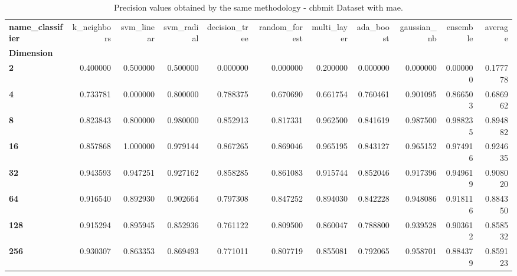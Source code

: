 \begin{table}
\centering
\caption{Precision values obtained by the same methodology - chbmit Dataset with mae.}
\label{precision_chbmit_mae-reproduction}
\begin{tabular}{lrrrrrrrrrr}
\toprule
\textbf{name\_classifier} &  k\_neighbors &  svm\_linear &  svm\_radial &  decision\_tree &  random\_forest &  multi\_layer &  ada\_boost &  gaussian\_nb &  ensemble &   average \\
\textbf{Dimension} &              &             &             &                &                &              &            &              &           &           \\
\midrule
\textbf{2        } &     0.400000 &    0.500000 &    0.500000 &       0.000000 &       0.000000 &     0.200000 &   0.000000 &     0.000000 &  0.000000 &  0.177778 \\
\textbf{4        } &     0.733781 &    0.000000 &    0.800000 &       0.788375 &       0.670690 &     0.661754 &   0.760461 &     0.901095 &  0.866503 &  0.686962 \\
\textbf{8        } &     0.823843 &    0.800000 &    0.980000 &       0.852913 &       0.817331 &     0.962500 &   0.841619 &     0.987500 &  0.988235 &  0.894882 \\
\textbf{16       } &     0.857868 &    1.000000 &    0.979144 &       0.867265 &       0.869046 &     0.965195 &   0.843127 &     0.965152 &  0.974916 &  0.924635 \\
\textbf{32       } &     0.943593 &    0.947251 &    0.927162 &       0.858285 &       0.861083 &     0.915744 &   0.852046 &     0.917396 &  0.949619 &  0.908020 \\
\textbf{64       } &     0.916540 &    0.892930 &    0.902664 &       0.797308 &       0.847252 &     0.894030 &   0.842228 &     0.948086 &  0.918116 &  0.884350 \\
\textbf{128      } &     0.915294 &    0.895945 &    0.852936 &       0.761122 &       0.809500 &     0.860047 &   0.788800 &     0.939528 &  0.903612 &  0.858532 \\
\textbf{256      } &     0.930307 &    0.863353 &    0.869493 &       0.771011 &       0.807719 &     0.855081 &   0.792065 &     0.958701 &  0.884379 &  0.859123 \\
\bottomrule
\end{tabular}
\end{table}

